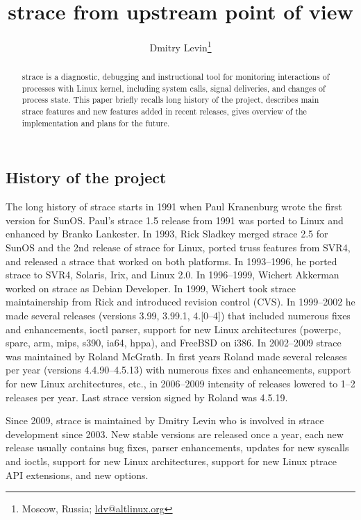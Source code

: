 \documentclass[10pt, a5paper]{article}
\begin{document}
\title{strace from upstream point of view}%

\author{Dmitry Levin\footnote{Moscow, Russia; \url{ldv@altlinux.org}}}
\maketitle

\begin{abstract}
strace is a diagnostic, debugging and instructional tool for \linebreak monitoring interactions of processes with Linux kernel, including system calls, signal deliveries, and changes of process state. This paper briefly recalls long history of the project, describes main strace features and new features added in recent releases, gives overview of the implementation and plans for the future.
\end{abstract}

\subsection*{History of the project}

The long history of strace starts in 1991 when Paul Kranenburg wrote the first version for SunOS.
Paul's strace 1.5 release from 1991 was ported to Linux and enhanced by Branko Lankester.
In 1993, Rick Sladkey merged strace 2.5 for SunOS and the 2nd release of strace for Linux, ported truss features from SVR4, and released a strace that worked on both platforms.  In 1993--1996, he ported strace to SVR4, Solaris, Irix, and Linux 2.0.
In 1996--1999, Wichert Akkerman worked on strace as Debian Developer.
In 1999, Wichert took strace maintainership from Rick and introduced revision control (CVS).  In 1999--2002 he made several releases (versions 3.99, 3.99.1, 4.[0--4]) that included numerous fixes and enhancements, ioctl parser, support for new Linux architectures (powerpc, sparc, arm, mips, s390, ia64, hppa), and FreeBSD on i386.
In 2002--2009 strace was maintained by Roland McGrath.  In first years Roland made several releases per year (versions 4.4.90--4.5.13) with numerous fixes and enhancements, support for new Linux architectures, etc., in 2006--2009 intensity of releases lowered to 1--2 releases per year. Last strace version signed by Roland was 4.5.19.

Since 2009, strace is maintained by Dmitry Levin who is involved in strace development since 2003.  New stable versions are released once a year, each new release usually contains bug fixes, parser enhancements, updates for new syscalls and ioctls, support for new Linux architectures, support for new Linux ptrace API extensions, and new options.
\end{document}
